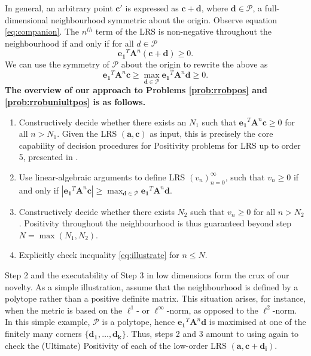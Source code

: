 In general, an arbitrary point $\mathbf{c'}$ is expressed as $\mathbf{c} + \mathbf{d}$, where $\mathbf{d} \in \mathcal{P}$, a full-dimensional neighbourhood symmetric about the origin. Observe equation \ref{eq:companion}. The $n^{th}$ term of the LRS is non-negative throughout the neighbourhood if and only if for all $d \in \mathcal{P}$
\begin{equation}
\mathbf{e_1}^T \mathbf{A}^n (\mathbf{c + d}) \ge 0.
\end{equation}
We can use the symmetry of $\mathcal{P}$ about the origin to rewrite the above as
\begin{equation}
\label{eq:illustrate}
\mathbf{e_1}^T \mathbf{A}^n \mathbf{c}\ge \max_{\mathbf{d} \in \mathcal{P}} \mathbf{e_1}^T\mathbf{A}^n\mathbf{d} \ge 0.
\end{equation}
\textbf{The overview of our approach to Problems \ref{prob:rrobpos} and \ref{prob:rrobuniultpos} is as follows.}
\begin{enumerate}
\item Constructively decide whether there exists an $N_1$ such that $\mathbf{e_1}^T \mathbf{A}^n \mathbf{c} \ge 0$ for all $n > N_1$. Given the LRS $(\mathbf{a}, \mathbf{c})$ as input, this is precisely the core capability of decision procedures for Positivity problems for LRS up to order 5, presented in \cite{joeljames3}.
\item Use linear-algebraic arguments to define LRS $(v_n)_{n=0}^\infty$, such that $v_n \ge 0$ if and only if $|\mathbf{e_1}^T \mathbf{A}^n \mathbf{c}|\ge \max_{\mathbf{d} \in \mathcal{P}} \mathbf{e_1}^T\mathbf{A}^n\mathbf{d}$.
\item Constructively decide whether there exists $N_2$ such that $v_n \ge 0$ for all $n > N_2$. Positivity throughout the neighbourhood is thus guaranteed beyond step $N = \max(N_1, N_2)$.
\item Explicitly check inequality \ref{eq:illustrate} for $n \le N$.
\end{enumerate}

Step 2 and the executability of Step 3 in low dimensions form the crux of our novelty. As a simple illustration, assume that the neighbourhood is defined by a polytope rather than a positive definite matrix. This situation arises, for instance, when the metric is based on the $\ell^1$- or $\ell^\infty$-norm, as opposed to the $\ell^2$-norm.  In this simple example, $\mathcal{P}$ is a polytope, hence $\mathbf{e_1}^T\mathbf{A}^n\mathbf{d}$ is maximised at one of the finitely many corners $\{\mathbf{d_1}, \dots, \mathbf{d_k}\}$. Thus, steps 2 and 3 amount to using \cite{joeljames3} again to check the (Ultimate) Positivity of each of the low-order LRS $(\mathbf{a}, \mathbf{c+d_i})$.

